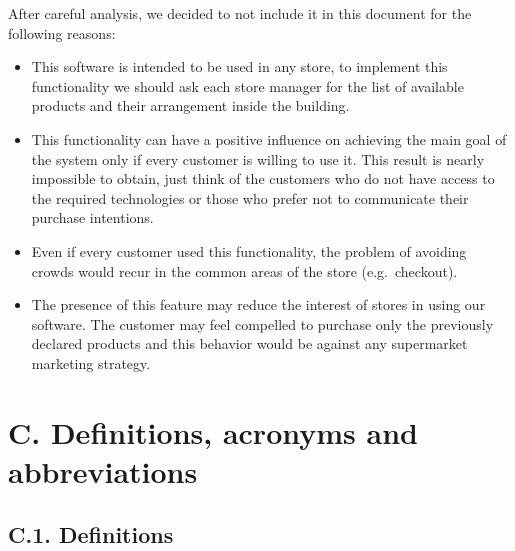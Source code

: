 After careful analysis, we decided to not include it in this document for the following reasons: 
\begin{itemize}
\item 
    This software is intended to be used in any store, to implement this functionality we should ask each store manager for the list of available products and their arrangement inside the building.
\item
    This functionality can have a positive influence on achieving the main goal of the system only if every customer is willing to use it. This result is nearly impossible to obtain, just think of the customers who do not have access to the required technologies or those who prefer not to communicate their purchase intentions.
\item
    Even if every customer used this functionality, the problem of avoiding crowds would recur in the common areas of the store (e.g.~checkout).
\item
    The presence of this feature may reduce the interest of stores in using our software. The customer may feel compelled to purchase only the previously declared products and this behavior would be against any supermarket marketing strategy.
\end{itemize}

\section{C. Definitions, acronyms and abbreviations}

\subsection{C.1. Definitions}

